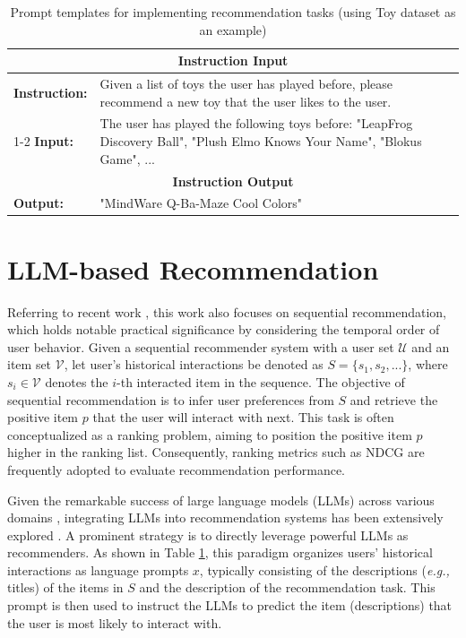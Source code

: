 \documentclass[sigconf,natbib=true]{acmart}
\newcommand{\eg}{\emph{e.g., }}
\begin{document}
\begin{table}[t]
\centering
\caption{Prompt templates for implementing recommendation tasks (using Toy dataset as an example)}
\begin{tabularx}{\columnwidth}{@{}lX@{}}
    \toprule
    \multicolumn{2}{c}{\textbf{Instruction Input}} \\
    \midrule
    \textbf{Instruction:} & Given a list of toys the user has played before, please recommend a new toy that the user likes to the user. \\
    \cmidrule(l){1-2}
    \textbf{Input:} & The user has played the following toys before: "LeapFrog Discovery Ball", "Plush Elmo Knows Your Name", "Blokus Game", ... \\
    \midrule
    \multicolumn{2}{c}{\textbf{Instruction Output}} \\
    \midrule
    \textbf{Output:} & "MindWare Q-Ba-Maze Cool Colors" \\
    \bottomrule
\end{tabularx}
\label{tab:LLM4Rec_example}
\end{table}


\section{LLM-based Recommendation}
Referring to recent work \cite{liao2024llara, bao2023bi, na2024enhancing, bao2023tallrec, lin2024rella, zheng2024adapting}, this work also focuses on sequential recommendation, which holds notable practical significance by considering the temporal order of user behavior. Given a sequential recommender system with a user set $\mathcal{U}$ and an item set $\mathcal{V}$, let user's historical interactions be denoted as $S=\{s_1,s_2, ...\}$, where $s_i \in \mathcal{V}$ denotes the $i$-th interacted item in the sequence. The objective of sequential recommendation is to infer user preferences from $S$ and retrieve the positive item $p$ that the user will interact with next. This task is often conceptualized as a ranking problem, aiming to position the positive item $p$ higher in the ranking list. Consequently, ranking metrics such as NDCG are frequently adopted to evaluate recommendation performance.

Given the remarkable success of large language models (LLMs) across various domains \cite{wu2023visual, ouyang2022training, tang2024graphgpt}, integrating LLMs into recommendation systems has been extensively explored \cite{wu2024survey}. A prominent strategy is to directly leverage powerful LLMs as recommenders. As shown in Table \ref{tab:LLM4Rec_example}, this paradigm organizes users' historical interactions as language prompts $x$, typically consisting of the descriptions (\eg titles) of the items in $S$ and the description of the recommendation task. This prompt is then used to instruct the LLMs to predict the item (descriptions) that the user is most likely to interact with. 
\end{document}
